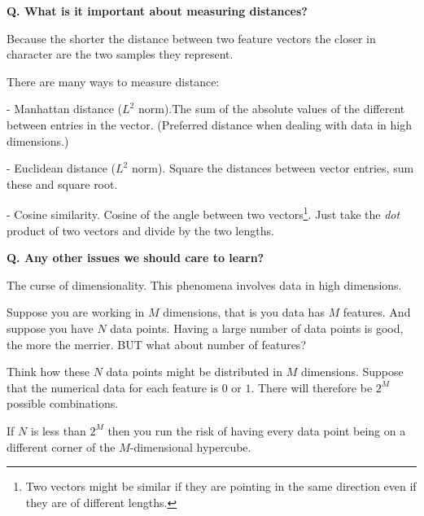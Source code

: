 \begin{frame}[fragile, label={distance}]{\textbf{Q. What is it important about measuring distances?}}
  \begin{wideitemize}
    \item Because the shorter the distance between two feature vectors the closer
    in character are the two samples they represent.
    \item There are many ways to measure distance:
    \begin{wideitemize}
      \item[-] Manhattan distance ($L^{2}$ norm).The sum of the absolute values of the different between
      entries in the vector. (Preferred distance when dealing with data in high dimensions.)
      \item[-] Euclidean distance ($L^{2}$ norm). Square the distances between vector entries,
      sum these and square root.
      \item[-] Cosine similarity. Cosine of the angle between two vectors\footnote{Two vectors
      might be similar if they are pointing in the same direction even if they are of different lengths.}.
      Just take the \textit{dot} product of two vectors and divide by the two lengths.
    \end{wideitemize}
  \end{wideitemize}
\end{frame}

\begin{frame}[fragile, label={CoD}]{\textbf{Q. Any other issues we should care to learn?}}
  \begin{wideitemize}
    \item The curse of dimensionality. This phenomena involves data in high dimensions.
    \item Suppose you are working in $M$ dimensions, that is you data has $M$
    features. And suppose you have $N$ data points. Having a large number of
    data points is good, the more the merrier. BUT what about number of features?
    \item Think how these $N$ data points might be distributed in $M$ dimensions.
    Suppose that the numerical data for each feature is $0$ or $1$. There will
    therefore be $2^{M}$ possible combinations.
    \item If $N$ is less than $2^{M}$ then you run the risk of having every data
    point being on a different corner of the $M$-dimensional hypercube.
  \end{wideitemize}
\end{frame}


